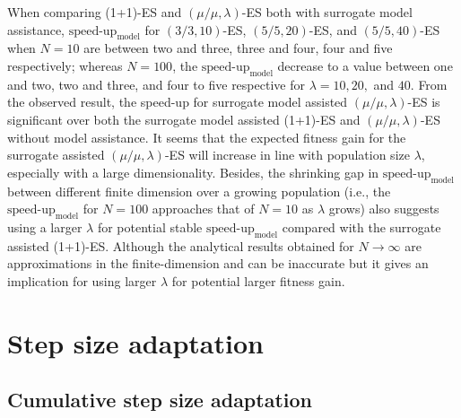 When comparing (1+1)-ES and $(\mu/\mu,\lambda)$-ES both with surrogate model assistance, $\text{speed-up}_{\text{model}}$ for $(3/3,10)$-ES, $(5/5,20)$-ES, and $(5/5,40)$-ES when $N=10$ are between two and three, three and four, four and five respectively; whereas $N=100$, the $\text{speed-up}_{\text{model}}$ decrease to a value between one and two, two and three, and four to five respective for $\lambda=10,20,$ and $40$. From the observed result, the speed-up for surrogate model assisted $(\mu/\mu,\lambda)$-ES is significant over both the surrogate model assisted (1+1)-ES and $(\mu/\mu,\lambda)$-ES without model assistance. It seems that the expected fitness gain for the surrogate assisted $(\mu/\mu,\lambda)$-ES will increase in line with population size $\lambda$, especially with a large dimensionality. Besides, the shrinking gap in $\text{speed-up}_{\text{model}}$ between different finite dimension over a growing population (i.e., the $\text{speed-up}_{\text{model}}$ for $N=100$ approaches that of $N=10$ as $\lambda$ grows) also suggests using a larger $\lambda$ for potential stable $\text{speed-up}_{\text{model}}$ compared with the surrogate assisted (1+1)-ES. Although the analytical results obtained for $N\rightarrow \infty$ are approximations in the finite-dimension and can be inaccurate but it gives an implication for using larger $\lambda$ for potential larger fitness gain.










\section{Step size adaptation}\label{sec:step_size_adaptation}

\subsection{Cumulative step size adaptation}

